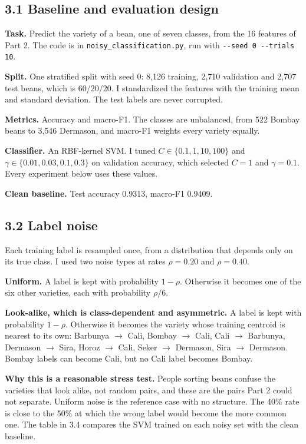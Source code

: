 \documentclass[11pt]{article}
\begin{document}
\subsection*{3.1 Baseline and evaluation design}

\textbf{Task.} Predict the variety of a bean, one of seven classes, from the 16 features
of Part 2. The code is in \texttt{noisy\_classification.py}, run with
\texttt{-{}-seed 0 -{}-trials 10}.

\textbf{Split.} One stratified split with seed 0: 8{,}126 training, 2{,}710 validation and
2{,}707 test beans, which is 60/20/20. I standardized the features with the training
mean and standard deviation. The test labels are never corrupted.

\textbf{Metrics.} Accuracy and macro-F1. The classes are unbalanced, from 522 Bombay
beans to 3{,}546 Dermason, and macro-F1 weights every variety equally.

\textbf{Classifier.} An RBF-kernel SVM. I tuned $C\in\{0.1,1,10,100\}$ and
$\gamma\in\{0.01,0.03,0.1,0.3\}$ on validation accuracy, which selected $C=1$ and
$\gamma=0.1$. Every experiment below uses these values.

\textbf{Clean baseline.} Test accuracy 0.9313, macro-F1 0.9409.

\subsection*{3.2 Label noise}

Each training label is resampled once, from a distribution that depends only on its true
class. I used two noise types at rates $\rho=0.20$ and $\rho=0.40$.

\textbf{Uniform.} A label is kept with probability $1-\rho$. Otherwise it becomes one of
the six other varieties, each with probability $\rho/6$.

\textbf{Look-alike, which is class-dependent and asymmetric.} A label is kept with
probability $1-\rho$. Otherwise it becomes the variety whose training centroid is nearest
to its own: Barbunya $\to$ Cali, Bombay $\to$ Cali, Cali $\to$ Barbunya, Dermason $\to$
Sira, Horoz $\to$ Cali, Seker $\to$ Dermason, Sira $\to$ Dermason. Bombay labels can
become Cali, but no Cali label becomes Bombay.

\textbf{Why this is a reasonable stress test.} People sorting beans confuse the varieties
that look alike, not random pairs, and these are the pairs Part 2 could not separate.
Uniform noise is the reference case with no structure. The 40\% rate is close to the
50\% at which the wrong label would become the more common one. The table in 3.4 compares
the SVM trained on each noisy set with the clean baseline.
\end{document}
